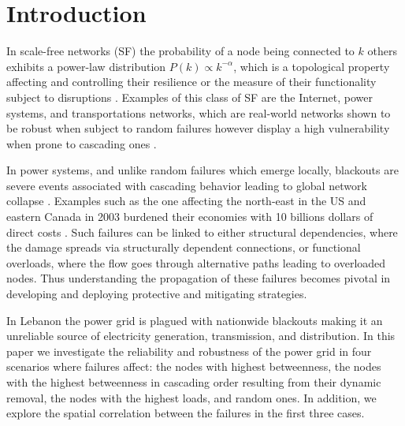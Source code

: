 \section{Introduction}
In scale-free networks (SF) the probability of a node being connected to $k$ others exhibits a power-law distribution $P(k) \propto k^{-\alpha}$, which is a topological property affecting and controlling their resilience or the measure of their functionality subject to disruptions \cite{Newman:2003da,Gao:2015fg,Bashan:2013cja,Gao:2015fga,2000Natur.406..378A}. Examples of this class of SF are the Internet, power systems, and transportations networks, which are real-world networks shown to be robust when subject to random failures however display a high vulnerability when prone to cascading ones \cite{Bompard:2011cd,DuenasOsorio:2009ff,2016arXiv160904310M,Cohen:2001hf}. 

In power systems, and unlike random failures which emerge locally, blackouts are severe events  associated with cascading behavior leading to global network collapse \cite{RosasCasals:2007td,Bompard:2009ga,Brummitt:2013jj,Daqing:2014bp,Albert:2004bw,Wang:2011js,Sole:2008cv}.
Examples such as the one affecting the north-east in the US and eastern Canada in 2003 burdened their economies with 10 billions dollars of direct costs \cite{Daqing:2014bp}. Such failures can be linked to either structural dependencies, where the damage spreads via structurally dependent connections, or functional overloads, where the flow goes through alternative paths leading to overloaded nodes. Thus understanding the propagation of these failures becomes pivotal in developing and deploying protective and mitigating strategies. 

In Lebanon the power grid is plagued with nationwide blackouts making it an unreliable source of electricity generation, transmission, and distribution. In this paper we investigate the reliability and robustness of the power grid in four scenarios where failures affect: the nodes with highest betweenness, the nodes with the highest betweenness in cascading order resulting from their dynamic removal, the nodes with the highest loads, and random ones. In addition, we explore the spatial correlation between the failures in the first three cases. 
